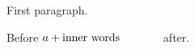 \documentclass{article}
\begin{document}
First paragraph.

Before $a + \mbox{\parbox[t]{3cm}{inner words \lxmbf}}$ after.
\end{document}
